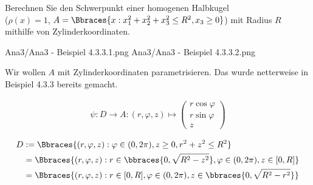 
\begin{exercise}

Berechnen Sie den Schwerpunkt einer homogenen Halbkugel \\
($\rho(x) = 1$, $A = \Bbraces{x: x_1^2 + x_2^2 + x_3^2 \leq R^2, x_3 \geq 0}$) mit Radius $R$ mithilfe von Zylinderkoordinaten.

\end{exercise}


\begin{solution}

\phantom{}

{Ana3/Ana3 - Beispiel 4.3.3.1.png}
{Ana3/Ana3 - Beispiel 4.3.3.2.png}

Wir wollen $A$ mit Zylinderkoordinaten parametrisieren.
Das wurde netterweise in Beispiel 4.3.3 bereits gemacht.

\begin{align*}
    \psi:
    D \to A:
    (r, \varphi, z)
    \mapsto
    \begin{pmatrix}
        r \cos \varphi \\ r \sin \varphi \\ z
    \end{pmatrix}
\end{align*}

\begin{align*}
    D
    & :=
    \Bbraces
    {
        (r, \varphi, z):
        \varphi \in (0, 2 \pi),
        z \geq 0,
        r^2 + z^2 \leq R^2
    } \\
    & =
    \Bbraces
    {
        (r, \varphi, z):
        r \in \bbraces{0, \sqrt{R^2 - z^2}},
        \varphi \in (0, 2 \pi),
        z \in [0, R]
    } \\
    & =
    \Bbraces
    {
        (r, \varphi, z):
        r \in [0, R],
        \varphi \in (0, 2 \pi),
        z \in \bbraces{0, \sqrt{R^2 - r^2}}
    }
\end{align*}


\end{solution}
